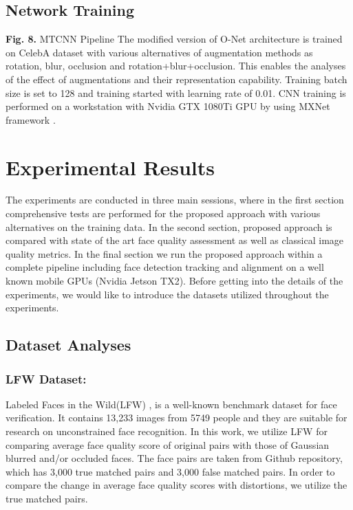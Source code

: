 \documentclass[runningheads]{llncs}
\begin{document}
\subsection{Network Training}

\textbf{Fig. 8.} MTCNN  Pipeline The modified version of O-Net architecture is trained on CelebA dataset with various alternatives of augmentation methods as rotation, blur, occlusion and rotation+blur+occlusion. This enables the analyses of the effect of augmentations and their representation capability. Training batch size is set to 128 and training started with learning rate of 0.01. CNN training is performed on a workstation with Nvidia GTX 1080Ti GPU by using MXNet framework \cite{MXNet2015}. 

\section{Experimental Results}

The experiments are conducted in three main sessions, where in the first section comprehensive tests are performed for the proposed approach with various alternatives on the training data. In the second section, proposed approach is compared with state of the art face quality assessment as well as classical image quality metrics. In the final section we run the proposed approach within a complete pipeline including face detection tracking and alignment on a well known mobile GPUs (Nvidia Jetson TX2). Before getting into the details of the experiments, we would like to introduce the datasets utilized throughout the experiments.

\subsection{Dataset Analyses}

\subsubsection{LFW Dataset:}

Labeled Faces in the Wild(LFW) \cite{LFW2007},\cite{LFW2014} is a well-known benchmark dataset for face verification. It contains 13,233 images from 5749 people and they are suitable for research on unconstrained face recognition. In this work, we utilize LFW for comparing average face quality score of original pairs with those of Gaussian blurred and/or occluded faces. The face pairs are taken from \cite{ArcFace2018} Github repository, which has 3,000 true matched pairs and 3,000 false matched pairs. In order to compare the change in average face quality scores with distortions, we utilize the true matched pairs.
\end{document}

